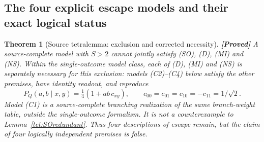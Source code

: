 \documentclass[11pt,a4paper]{article}
\newtheorem{theorem}{Theorem}[section]
\theoremstyle{definition}
\theoremstyle{remark}\newtheorem{remark}[theorem]{Remark}
\newcommand{\status}[1]{\textbf{[#1]}\quad}
\begin{document}
\subsection{The four explicit escape models and their exact logical status}
\begin{theorem}[Source tetralemma: exclusion and corrected necessity]\label{tet:tetralemma}
\status{Proved}
A source-complete model with $S>2$ cannot jointly satisfy (SO), (D), (MI) and (NS). Within the single-outcome model class, each of (D), (MI) and (NS) is separately necessary for this exclusion: models (C2)--(C4) below satisfy the other premises, have identity readout, and reproduce
\[
 P_Q(a,b\mid x,y)=\tfrac14(1+ab\,c_{xy}),\qquad
 c_{00}=c_{01}=c_{10}=-c_{11}=1/\sqrt2.
\]
Model (C1) is a source-complete branching realization of the same branch-weight table, outside the single-outcome formalism. It is not a counterexample to Lemma~\ref{tet:SOredundant}. Thus four descriptions of escape remain, but the claim of four logically independent premises is false.
\end{theorem}
\end{document}
